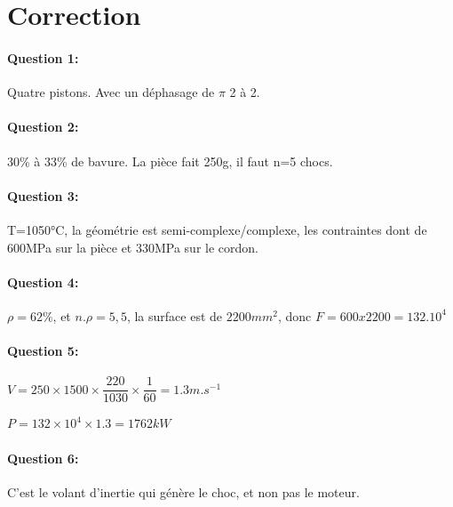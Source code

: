 \pagestyle{correction}

\section{Correction}

\paragraph{Question 1:} Quatre pistons. Avec un déphasage de $\pi$ 2 à 2.

\paragraph{Question 2:} 30\% à 33\% de bavure. La pièce fait 250g, il faut n=5 chocs.

\paragraph{Question 3:} T=1050°C, la géométrie est semi-complexe/complexe, les contraintes dont de 600MPa sur la pièce et 330MPa sur le cordon.

\paragraph{Question 4:} $\rho=62\%$, et $n.\rho=5,5$, la surface est de $2200mm^2$, donc $F=600x2200=132.10^4$
  
\paragraph{Question 5:} $V=250\times 1500\times \dfrac{220}{1030}\times \dfrac{1}{60}=1.3m.s^{-1}$

$P=132\times 10^4\times 1.3=1762kW$

\paragraph{Question 6:} C'est le volant d'inertie qui génère le choc, et non pas le moteur.


